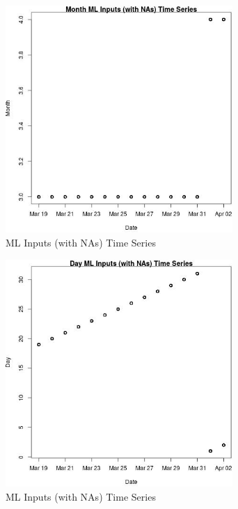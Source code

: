 \begin{figure} 
\centering  
\includegraphics[width=0.77\textwidth]{Code_Outputs/Report_ML_input_PM25_Step4_part_e_de_duplicated_aveswNAs_MonthvDate.jpg} 
\caption{\label{fig:Report_ML_input_PM25_Step4_part_e_de_duplicated_aveswNAsMonthvDate}ML Inputs (with NAs) Time Series} 
\end{figure} 
 

\begin{figure} 
\centering  
\includegraphics[width=0.77\textwidth]{Code_Outputs/Report_ML_input_PM25_Step4_part_e_de_duplicated_aveswNAs_DayvDate.jpg} 
\caption{\label{fig:Report_ML_input_PM25_Step4_part_e_de_duplicated_aveswNAsDayvDate}ML Inputs (with NAs) Time Series} 
\end{figure} 
 

